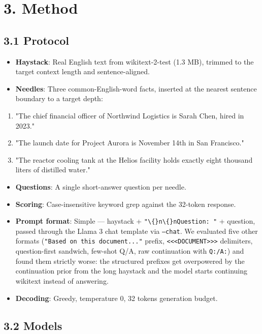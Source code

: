 \documentclass[11pt]{article}
\begin{document}
\section*{3. Method}


\subsection*{3.1 Protocol}


\begin{itemize}
\item \textbf{Haystack}: Real English text from wikitext-2-test (1.3 MB), trimmed to the target context length and sentence-aligned.
\item \textbf{Needles}: Three common-English-word facts, inserted at the nearest sentence boundary to a target depth:
\end{itemize}

\begin{enumerate}
\item "The chief financial officer of Northwind Logistics is Sarah Chen, hired in 2023."
\item "The launch date for Project Aurora is November 14th in San Francisco."
\item "The reactor cooling tank at the Helios facility holds exactly eight thousand liters of distilled water."
\end{enumerate}

\begin{itemize}
\item \textbf{Questions}: A single short-answer question per needle.
\item \textbf{Scoring}: Case-insensitive keyword grep against the 32-token response.
\item \textbf{Prompt format}: Simple — haystack + \texttt{"\textbackslash\{\}n\textbackslash\{\}nQuestion: "} + question, passed through the Llama 3 chat template via \texttt{--chat}. We evaluated five other formats (\texttt{"Based on this document..."} prefix, \texttt{<<<DOCUMENT>>>} delimiters, question-first sandwich, few-shot Q/A, raw continuation with \texttt{Q:/A:}) and found them strictly worse: the structured prefixes get overpowered by the continuation prior from the long haystack and the model starts continuing wikitext instead of answering.
\item \textbf{Decoding}: Greedy, temperature 0, 32 tokens generation budget.
\end{itemize}


\subsection*{3.2 Models}
\end{document}
